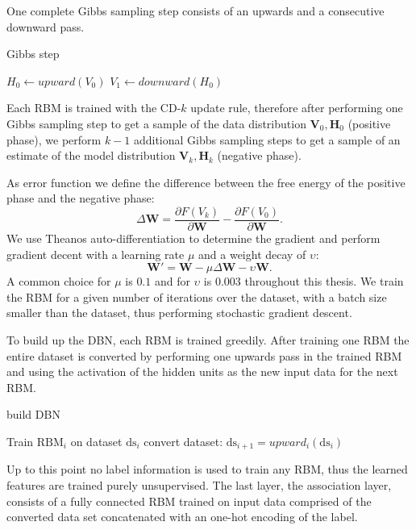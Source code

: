 One complete Gibbs sampling step consists of an upwards and a consecutive downward pass.

\begin{algorithm}
\caption{Gibbs step}
\begin{algorithmic}
\State $H_0 \gets upward(V_0) $  
\State $V_1 \gets downward(H_0) $  
\end{algorithmic}
\end{algorithm}

Each RBM is trained with the CD-$k$ update rule, therefore after performing one Gibbs sampling step to get a sample of the data distribution $\textbf{V}_0, \textbf{H}_0$  (positive phase), we perform $k-1$ additional Gibbs sampling steps to get a sample of an estimate of the model distribution $\textbf{V}_k, \textbf{H}_k$  (negative phase).

As error function we define the difference between the free energy of the positive phase and the negative phase:
\[
\Delta \textbf{W} = \frac{\partial F(V_k)}{\partial \textbf{W}} -  \frac{\partial F(V_0)}{\partial \textbf{W}} .
\]
We use Theanos auto-differentiation to determine the gradient and perform gradient decent with a learning rate $\mu$ and a weight decay of $\upsilon$:
\[
\textbf{W}' = \textbf{W} - \mu \Delta \textbf{W} - \upsilon \textbf{W} .
\]
A common choice for $\mu$ is $0.1$ and for $\upsilon$ is $0.003$ throughout this thesis.
We train the RBM for a given number of iterations over the dataset, with a batch size smaller than the dataset, thus performing stochastic gradient descent.

To build up the DBN, each RBM is trained greedily.
After training one RBM the entire dataset is converted by performing one upwards pass in the trained RBM and using the activation of the hidden units as the new input data for the next RBM.

\begin{algorithm}
\caption{build DBN}
\begin{algorithmic}
\State Train $\text{RBM}_i$ on dataset $\text{ds}_i$
\State convert dataset: $\text{ds}_{i+1} = upward_i(\text{ds}_i)$ 
\EndFor
\end{algorithmic}
\end{algorithm}

Up to this point no label information is used to train any RBM, thus the learned features are trained purely unsupervised.
The last layer, the association layer, consists of a fully connected RBM trained on input data comprised of the converted data set concatenated with an one-hot encoding of the label.




